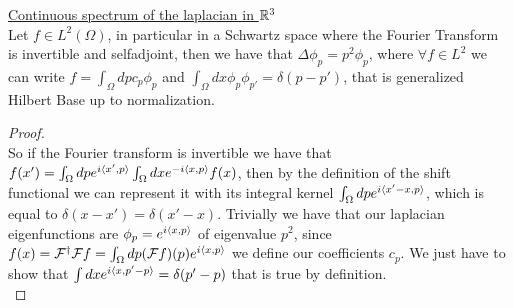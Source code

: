 \documentclass[../2.tex]{subfiles}
\begin{document}
{\begin{prop}
    \underline{Continuous spectrum of the laplacian in $\mathbb{R}^3$}\\
    Let $f \in L^2(\Omega)$, in particular in a Schwartz space where the Fourier Transform is invertible and selfadjoint,
    then we have that $\Delta \phi_p = p^2 \phi_p$, where $\forall f \in L^2$ we can write $f = \int_\Omega dp c_p \phi_p$
    and $\int_\Omega dx \phi_p \phi_{p'} = \delta(p-p')$, that is generalized Hilbert Base up to normalization.
\end{prop}
\begin{proof} \hfill  \\
    So if the Fourier transform is invertible we have that $f(x') = \int_\Omega dp e^{i\langle x', p \rangle}\int_\Omega dx e^{-i\langle x, p \rangle}f(x)$, 
    then by the definition of the shift functional we can represent it with its integral kernel $\int_\Omega dp e^{i\langle x'-x, p \rangle}$, which
    is equal to $\delta(x-x') = \delta(x'-x)$. Trivially we have that our laplacian eigenfunctions are $\phi_p = e^{i\langle x, p \rangle}$ of eigenvalue $p^2$, since 
    $f(x) = \mathcal{F}^\dag \mathcal{F}f = \int_\Omega dp (\mathcal{F}f)(p)e^{i\langle x, p \rangle}$ we define our coefficients $c_p$. We just have to show that
    $\int dx e^{i\langle x, p'-p \rangle} = \delta(p'-p)$ that is true by definition.\\
\end{proof}}
    
\end{document}
